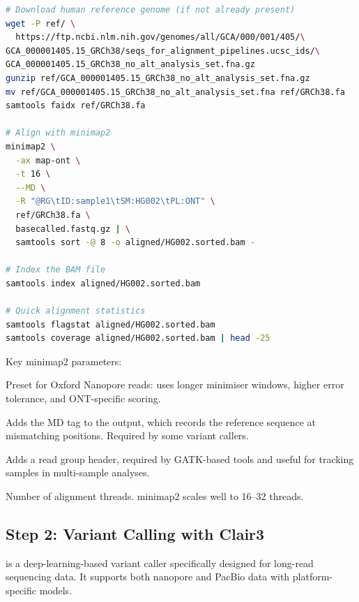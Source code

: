 \begin{lstlisting}[language=bash,caption={Aligning nanopore reads with minimap2.},label=lst:diy-minimap2]
# Download human reference genome (if not already present)
wget -P ref/ \
  https://ftp.ncbi.nlm.nih.gov/genomes/all/GCA/000/001/405/\
GCA_000001405.15_GRCh38/seqs_for_alignment_pipelines.ucsc_ids/\
GCA_000001405.15_GRCh38_no_alt_analysis_set.fna.gz
gunzip ref/GCA_000001405.15_GRCh38_no_alt_analysis_set.fna.gz
mv ref/GCA_000001405.15_GRCh38_no_alt_analysis_set.fna ref/GRCh38.fa
samtools faidx ref/GRCh38.fa

# Align with minimap2
minimap2 \
  -ax map-ont \
  -t 16 \
  --MD \
  -R "@RG\tID:sample1\tSM:HG002\tPL:ONT" \
  ref/GRCh38.fa \
  basecalled.fastq.gz | \
  samtools sort -@ 8 -o aligned/HG002.sorted.bam -

# Index the BAM file
samtools index aligned/HG002.sorted.bam

# Quick alignment statistics
samtools flagstat aligned/HG002.sorted.bam
samtools coverage aligned/HG002.sorted.bam | head -25
\end{lstlisting}

Key minimap2 parameters:
\begin{description}[nosep]
  \item[\texttt{-ax map-ont}] Preset for Oxford Nanopore reads: uses longer minimiser windows, higher error tolerance, and ONT-specific scoring.
  \item[\texttt{--MD}] Adds the MD tag to the output, which records the reference sequence at mismatching positions. Required by some variant callers.
  \item[\texttt{-R}] Adds a read group header, required by GATK-based tools and useful for tracking samples in multi-sample analyses.
  \item[\texttt{-t 16}] Number of alignment threads. minimap2 scales well to 16--32 threads.
\end{description}

\subsection{Step 2: Variant Calling with Clair3}
\label{subsec:diyanalysis:clair3}

\software{Clair3} is a deep-learning-based variant caller specifically designed for long-read sequencing data. It supports both nanopore and PacBio data with platform-specific models.

